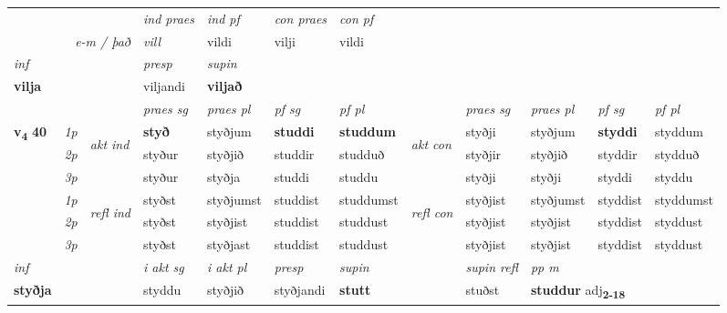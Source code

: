 \begin{longtable}[l]{X>{\footnotesize\itshape}llXXXXlXXXX}
   && &  \textit{ind praes} & \textit{ind pf} & \textit{con praes} & \textit{con pf} \\*
\multicolumn{3}{r}{\textit{e-m / það}} & vill & vildi & vilji & vildi \\*

\cmidrule{4-7}
   {\textit{inf}} & &     & \textit{presp} & \textit{supin}   \\*
  {\textbf{vilja}} & &     & viljandi &  \textbf{viljað}   \\*

\midrule

 & &   & \textit{praes sg}  & \textit{praes pl}    & \textit{ pf sg} & \textit{pf pl} & & \textit{praes sg}  & \textit{praes pl}    & \textit{pf sg} & \textit{pf pl }  \\ \cmidrule{4-7} \cmidrule{9-12}
 \multirow{2}{*}{{{\textbf{v{\textsubscript{4}}} \Large{\textbf{40}}}}}  & 1p & \multirow{3}{*}{\begin{turn}{90}\textit{akt ind}\end{turn}} & \textbf{styð} & styðjum & \textbf{studdi} & \textbf{studdum} & \multirow{3}{*}{\begin{turn}{90}\textit{akt con}\end{turn}} &styðji & styðjum & \textbf{styddi} & styddum\\*
 & 2p &  &  styður  & styðjið & studdir & studduð & & styðjir & styðjið & styddir & stydduð \\*
 & 3p &  & styður & styðja & studdi & studdu & & styðji & styðji& styddi & styddu \\*
\cmidrule{4-7} \cmidrule{9-12}
 & 1p & \multirow{3}{*}{\begin{turn}{90}\textit{refl ind}\end{turn}}  & styðst & styðjumst & studdist & studdumst & \multirow{3}{*}{\begin{turn}{90}\textit{refl con}\end{turn}}  &styðjist & styðjumst & styddist & styddumst \\*
 & 2p &  & styðst & styðjist & studdist & studdust & &styðjist & styðjist & styddist & styddust \\*
 & 3p  & & styðst & styðjast & studdist & studdust & & styðjist & styðjist& styddist & styddust \\*
\cmidrule{4-7} \cmidrule{9-12}

   {\textit{inf}} & &  & \textit{i akt sg} & \textit{i akt pl}   & \textit{presp} & \textit{supin} && \textit{supin refl} & \textit{pp m} \\*
  {\textbf{styðja}} & && styddu  & styðjið   & styðjandi &  \textbf{stutt} && stuðst & \multicolumn{2}{l}{\textbf{studdur} adj\textbf{\textsubscript{2-18}}} \\*


\end{longtable}
